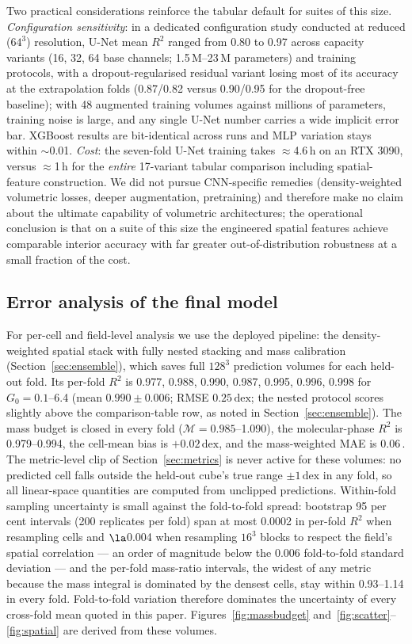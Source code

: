 \documentclass[fleqn,usenatbib]{rasti}
\newcommand{\Gzero}{G_0}
\newcommand{\dex}{\,\text{dex}}
\newcommand{\Rsq}{R^2}
\newcommand{\Mratio}{\mathcal{M}}
\begin{document}
Two practical considerations reinforce the tabular default for suites of
this size. \emph{Configuration sensitivity}: in a dedicated
configuration study conducted at reduced (\(64^3\)) resolution, U-Net mean
\(\Rsq\) ranged from 0.80 to 0.97 across capacity variants (16, 32, 64
base channels; 1.5\,M--23\,M parameters) and training protocols, with a
dropout-regularised residual variant losing most of its accuracy at the
extrapolation folds (0.87/0.82 versus 0.90/0.95 for the dropout-free
baseline); with 48 augmented training volumes against millions of
parameters, training noise is large, and any single U-Net number carries
a wide implicit error bar. XGBoost results are bit-identical across
runs and MLP variation stays within \(\sim\)0.01. \emph{Cost}: the
seven-fold U-Net training takes \(\approx\)4.6\,h on an RTX 3090, versus
\(\approx\)1\,h for the \emph{entire} 17-variant tabular comparison
including spatial-feature construction. We did not pursue CNN-specific
remedies (density-weighted volumetric losses, deeper augmentation,
pretraining) and therefore make no claim about the ultimate capability
of volumetric architectures; the operational conclusion is that on a
suite of this size the engineered spatial features achieve comparable
interior accuracy with far greater out-of-distribution robustness at a
small fraction of the cost.

\subsection{Error analysis of the final model}
\label{sec:per_fold}

For per-cell and field-level analysis we use the deployed pipeline: the
density-weighted spatial stack with fully nested stacking and mass
calibration (Section~\ref{sec:ensemble}), which saves full \(128^3\)
prediction volumes for each held-out fold. Its per-fold \(\Rsq\) is
0.977, 0.988, 0.990, 0.987, 0.995, 0.996, 0.998 for
\(\Gzero = 0.1\)--6.4 (mean \(0.990 \pm 0.006\); RMSE \(0.25\dex\); the
nested protocol scores slightly above the comparison-table row, as
noted in Section~\ref{sec:ensemble}). The mass budget is closed in
every fold (\(\Mratio = 0.985\)--1.090), the molecular-phase \(\Rsq\) is
0.979--0.994, the cell-mean bias is \(+0.02\dex\), and the mass-weighted
MAE is 0.06\dex. The metric-level clip of Section~\ref{sec:metrics} is
never active for these volumes: no predicted cell falls outside the
held-out cube's true range \(\pm 1\dex\) in any fold, so all linear-space
quantities are computed from unclipped predictions. Within-fold sampling
uncertainty is small against the fold-to-fold spread: bootstrap 95 per
cent intervals (200 replicates per fold) span at most 0.0002 in per-fold
\(\Rsq\) when resampling cells and \(\la\)0.004 when resampling \(16^3\)
blocks to respect the field's spatial correlation --- an order of
magnitude below the 0.006 fold-to-fold standard deviation --- and the
per-fold mass-ratio intervals, the widest of any metric because the mass
integral is dominated by the densest cells, stay within 0.93--1.14 in
every fold. Fold-to-fold variation therefore dominates the uncertainty
of every cross-fold mean quoted in this paper. Figures~\ref{fig:massbudget}
and~\ref{fig:scatter}--\ref{fig:spatial} are derived from these
volumes.
\end{document}
